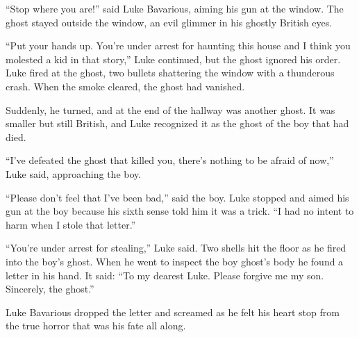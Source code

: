 ``Stop where you are!'' said Luke Bavarious, aiming his gun at the
window. The ghost stayed outside the window, an evil glimmer in his
ghostly British eyes.



``Put your hands up. You're under arrest for haunting this house and
I think you molested a kid in that story,'' Luke continued, but the
ghost ignored his order. Luke fired at the ghost, two bullets
shattering the window with a thunderous crash. When the smoke
cleared, the ghost had vanished.



Suddenly, he turned, and at the end of the hallway was another
ghost. It was smaller but still British, and Luke recognized it as
the ghost of the boy that had died.



``I've defeated the ghost that killed you, there's nothing to be
afraid of now,'' Luke said, approaching the boy.



``Please don't feel that I've been bad,'' said the boy. Luke stopped
and aimed his gun at the boy because his sixth sense told him it
was a trick. ``I had no intent to harm when I stole that
letter.''



``You're under arrest for stealing,'' Luke said. Two shells hit the
floor as he fired into the boy's ghost. When he went to inspect the
boy ghost's body he found a letter in his hand. It said: ``To my
dearest Luke. Please forgive me my son. Sincerely, the
ghost.''

\pagebreak

Luke Bavarious dropped the letter and screamed as he felt his heart
stop from the true horror that was his fate all along.
